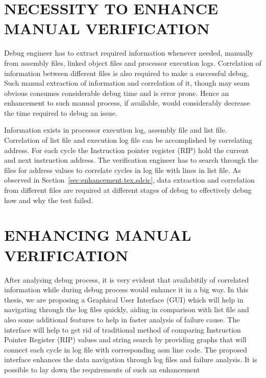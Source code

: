 \section {NECESSITY TO ENHANCE MANUAL VERIFICATION}
\label{sec:enhancement.tex.nemv}

Debug engineer has to extract required information whenever needed, manually from assembly files, linked object files and processor execution logs. Correlation of information between different files is also required to make a successful debug. Such manual extraction of information and correlation of it, though may seam obvious consumes considerable debug time and is error prone. Hence an enhancement to such manual process, if available, would considerably decrease the time required to debug an issue.

Information exists in processor execution log, assembly file and list file. Correlation of list file and execution log file can be accomplished by correlating address. For each cycle the Instruction pointer register (RIP) hold the current and next instruction address. The verification engineer has to search through the files for address values to correlate cycles in log file with lines in list file. As observed in Section~\ref{sec:enhancement.tex.sdcic}, data extraction and correlation from different files are required at different stages of debug to effectively debug how and why the test failed.

\section {ENHANCING MANUAL VERIFICATION}
\label{sec:enhancement.tex.emv}

After analysing debug process, it is very evident that availabitily of correlated information while during debug process would enhance it in a big way.  In this thesis, we are proposing a Graphical User Interface (GUI) which will help in navigating through the log files quickly, aiding in comparison with list file and also some additional features to help in faster analysis of failure cause. The interface will help to get rid of traditional method of comparing Instruction Pointer Register (RIP) values and string search by providing graphs that will connect each cycle in log file with corresponding asm line code. The proposed interface enhances the data navigation through log files and failure analysis.  It is possible to lay down the requirements of such an enhancement

